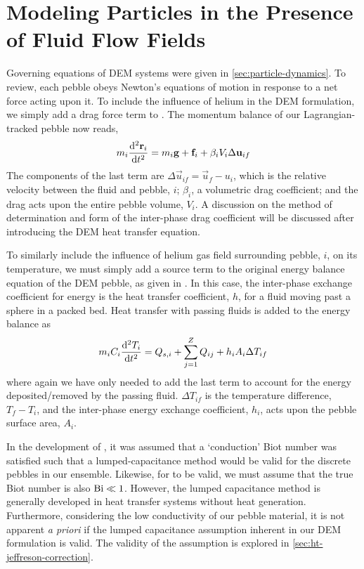 \section{Modeling Particles in the Presence of Fluid Flow Fields} \label{sec:modeling-cfd-dem}
Governing equations of DEM systems were given in \cref{sec:particle-dynamics}. To review, each pebble obeys Newton's equations of motion in response to a net force acting upon it. To include the influence of helium in the DEM formulation, we simply add a drag force term to . The momentum balance of our Lagrangian-tracked pebble now reads,
\begin{equation}\label{eq:cfdem-dem-momentum}
	m_i  \frac{\mathrm{d}^2{\mathbf{r}_i}}{\mathrm{d}t^2} = m_i\mathbf{g} + \mathbf{f}_i + \beta_i V_i \Delta \mathbf{u}_{if}
\end{equation}
The components of the last term are $\Delta \vec{u}_{if} = \vec{u}_f - u_i$, which is the relative velocity between the fluid and pebble, $i$; $\beta_i$, a volumetric drag coefficient; and the drag acts upon the entire pebble volume, $V_i$. A discussion on the method of determination and form of the inter-phase drag coefficient will be discussed after introducing the DEM heat transfer equation.

To similarly include the influence of helium gas field surrounding pebble, $i$, on its temperature, we must simply add a source term to the original energy balance equation of the DEM pebble, as given in . In this case, the inter-phase exchange coefficient for energy is the heat transfer coefficient, $h$, for a fluid moving past a sphere in a packed bed. Heat transfer with passing fluids is added to the energy balance as
\begin{equation}\label{eq:cfdem-dem-energy}
	m_iC_i \frac{\mathrm{d}^2{T_i}}{\mathrm{d}t^2} = Q_{s,i} + \sum_{j=1}^Z Q_{ij} + h_i A_i \Delta T_{if}
\end{equation}
where again we have only needed to add the last term to account for the energy deposited/removed by the passing fluid. $\Delta T_{if}$ is the temperature difference, $T_f - T_i$, and the inter-phase energy exchange coefficient, $h_i$, acts upon the pebble surface area, $A_i$.

In the development of , it was assumed that a `conduction' Biot number was satisfied such that a lumped-capacitance method would be valid for the discrete pebbles in our ensemble. Likewise, for  to be valid, we must assume that the true Biot number is also $\mathrm{Bi} \ll 1$. However, the lumped capacitance method is generally developed in heat transfer systems without heat generation. Furthermore, considering the low conductivity of our pebble material, it is not apparent \textit{a priori} if the lumped capacitance assumption inherent in our DEM formulation is valid. The validity of the assumption is explored in \cref{sec:ht-jeffreson-correction}.

